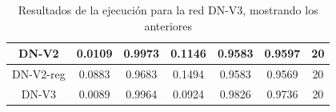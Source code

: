 \documentclass[11pt,a4paper]{article}
\theoremstyle{definition}
\begin{document}
\begin{table}[H]
\begin{tabular}{|c|c|c|c|c|c|c|}
\hline
DN-V2                                               & \textcolor[rgb]{0.129,0.129,0.129}{0.0109 } & \textcolor[rgb]{0.129,0.129,0.129}{0.9973 } & \textcolor[rgb]{0.129,0.129,0.129}{0.1146 }                                                                       & \textcolor[rgb]{0.129,0.129,0.129}{0.9583}                                                                             & \textcolor[rgb]{0.129,0.129,0.129}{0.9597}                                                                       & 20                                                                                                              \\
\hline
DN-V2-reg                                           & \textcolor[rgb]{0.129,0.129,0.129}{0.0883 } & \textcolor[rgb]{0.129,0.129,0.129}{0.9683 } & \textcolor[rgb]{0.129,0.129,0.129}{0.1494 }                                                                       & \textcolor[rgb]{0.129,0.129,0.129}{0.9583}                                                                             & \textcolor[rgb]{0.129,0.129,0.129}{0.9569}                                                                       & 20                                                                                                              \\
\hline
\rowcolor{green} DN-V3                                               & \textcolor[rgb]{0.129,0.129,0.129}{0.0089 } & \textcolor[rgb]{0.129,0.129,0.129}{0.9964 } & \textcolor[rgb]{0.129,0.129,0.129}{0.0924 }                                                                       & \textcolor[rgb]{0.129,0.129,0.129}{0.9826}                                                                             & \textcolor[rgb]{0.129,0.129,0.129}{0.9736}                                                                       & 20                                                                                                              \\
\hline


\end{tabular}
\caption{Resultados de la ejecución para la red DN-V3, mostrando los anteriores}
\end{table}
\end{document}
